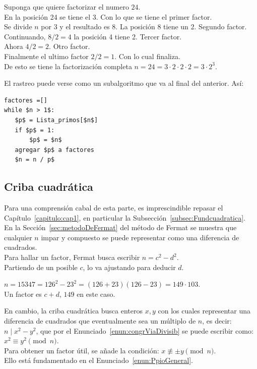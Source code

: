 \begin{ejemplo}
Suponga que quiere factorizar el numero $24$. \\
En la posición 24 se tiene el 3. Con lo que se tiene el primer factor. \\
Se divide $n$ por 3 y el resultado es 8. La posición 8 tiene un 2. Segundo factor. \\
Continuando, $8/2=4$ la posición 4 tiene 2. Tercer factor. \\
Ahora $4/2 = 2$. Otro factor. \\
Finalmente el ultimo factor $2/2=1$. Con lo cual finaliza. \\
De esto se tiene la factorización completa $n = 24 = 3 \cdot 2\cdot2\cdot2=3\cdot2^3$.
\end{ejemplo}

El rastreo puede verse como un subalgoritmo que va al final del anterior. Así: 

\begin{lstlisting}[caption={Rastreo}, mathescape=true]
factores =[]
while $n > 1$:
   $p$ = Lista_primos[$n$]  
   if $p$ = 1:
       $p$ = $n$
   agregar $p$ a factores
   $n = n / p$
\end{lstlisting}

\subsection{Criba cuadrática}
\label{subsec:cuadratica}
Para una comprensión cabal de esta parte, es imprescindible repasar el Capítulo~\ref{capitulo:cap1}, en particular la Subsección~\ref{subsec:Fundcuadratica}. \\

En la Sección~\ref{sec:metodoDeFermat} del método de Fermat se muestra que cualquier $n$ impar y compuesto se puede representar como una diferencia de cuadrados. \\
Para hallar un factor, Fermat busca escribir $n=c^2 - d^2$. \\
Partiendo de un posible $c$, lo va ajustando para deducir $d$. 

\begin{ejemplo}
$n = 15347 = 126^2 - 23^2 = (126+23)(126-23) = 149 \cdot 103$. \\
Un factor es $c+d$, $149$ en este caso.
\end{ejemplo}

En cambio, la criba cuadrática busca enteros $x,y$ con los cuales representar una diferencia de cuadrados que eventualmente sea un múltiplo de $n$, es decir: $n \mid x^2 - y^2$, que por el Enunciado~\ref{enun:congrViaDivisib} se puede escribir como: $x^2 \equiv y^2 \pmod n$. \\
Para obtener un factor útil, se añade la condición: $x \nequiv \pm y \pmod n$. \\
Ello está fundamentado en el Enunciado~\ref{enun:PpioGeneral}.

